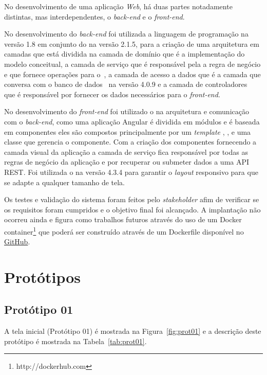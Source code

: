 No desenvolvimento de uma aplicação \textit{Web}, há duas partes notadamente distintas, mas interdependentes, o \textit{back-end} e o \textit{front-end}. 

No desenvolvimento do \textit{back-end} foi utilizada a linguagem de programação  na versão 1.8 em conjunto do  na versão 2.1.5, para a criação de uma arquitetura em camadas que está dividida na camada de domínio que é a implementação do modelo conceitual, a camada de serviço que é responsável pela a regra de negócio e que fornece operações para o~, a camada de acesso a dados que é a camada que conversa com o banco de dados~ na versão 4.0.9 e a camada de controladores~ que é responsável por fornecer os dados necessários para o \textit{front-end}. 

No desenvolvimento do \textit{front-end} foi utilizado o  na arquitetura e comunicação com o \textit{back-end}, como uma aplicação Angular é dividida em módulos e é baseada em componentes eles são compostos principalmente por um \textit{template} , , e uma classe que gerencia o componente. 
Com a criação dos componentes fornecendo a camada visual da aplicação a camada de serviço fica responsável por todas as regras de negócio da aplicação e por recuperar ou submeter dados a uma API REST. 
Foi utilizada o  na versão 4.3.4 para garantir o \textit{layout} responsivo para que se adapte a qualquer tamanho de tela.

Os testes e validação do sistema foram feitos pelo \textit{stakeholder} afim de verificar se os requisitos foram cumpridos e o objetivo final foi alcançado.
A implantação não ocorreu ainda e figura como trabalhos futuros através do uso de um Docker container\footnote{http://dockerhub.com} que poderá ser construído através de um Dockerfile disponível no \href{https://github.com/waldeyr/tcc-maryana}{GitHub}.

\newpage
\section{Protótipos}\label{Prototipos}
\subsection{Protótipo 01}\label{prototipo01}

A tela inicial (Protótipo 01) é mostrada na Figura~\ref{fig:prot01} e a descrição deste protótipo é mostrada na Tabela~\ref{tab:prot01}.


